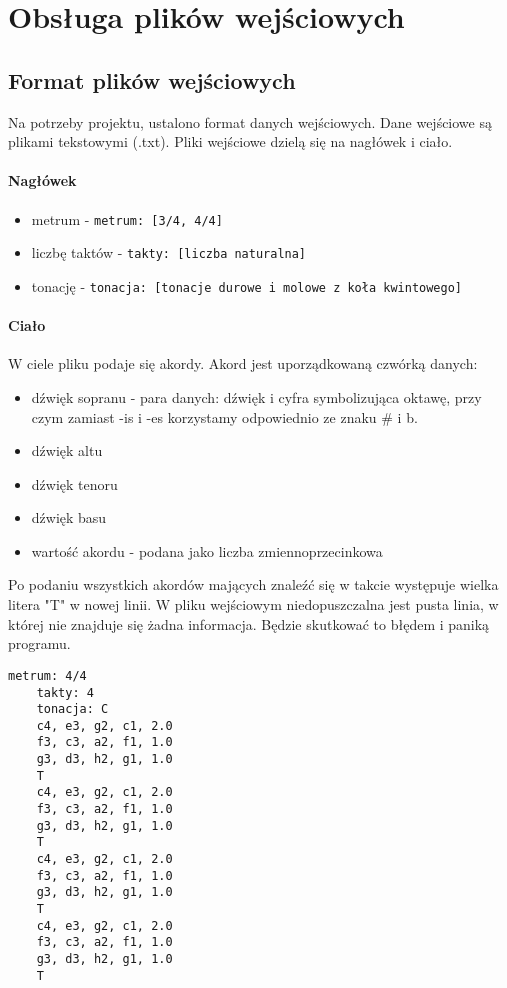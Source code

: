 \documentclass[dokumentacja.tex]{subfiles}
\begin{document}
\section{Obsługa plików wejściowych}
\subsection{Format plików wejściowych}
Na potrzeby projektu, ustalono format danych wejściowych. Dane wejściowe są plikami tekstowymi (.txt). Pliki wejściowe dzielą się na nagłówek i ciało. 
\paragraph*{Nagłówek}
\begin{itemize}
    \item metrum - \texttt{metrum: [3/4, 4/4]}
    \item liczbę taktów - \texttt{takty: [liczba naturalna]}
    \item tonację - \texttt{tonacja: [tonacje durowe i molowe z koła kwintowego]}
\end{itemize}
\paragraph*{Ciało}
W ciele pliku podaje się akordy. Akord jest uporządkowaną czwórką danych:
\begin{itemize}
    \item dźwięk sopranu - para danych: dźwięk i cyfra symbolizująca oktawę, przy czym zamiast -is i -es korzystamy odpowiednio ze znaku \# i b. 
    \item dźwięk altu
    \item dźwięk tenoru
    \item dźwięk basu
    \item wartość akordu - podana jako liczba zmiennoprzecinkowa
\end{itemize} 
Po podaniu wszystkich akordów mających znaleźć się w takcie występuje wielka litera "T" w nowej linii. 
W pliku wejściowym niedopuszczalna jest pusta linia, w której nie znajduje się żadna informacja. Będzie skutkować to błędem i paniką programu. 
\begin{lstlisting}[caption={Przykładowy poprawny plik wejściowy}, label=lst:wejscie-przyklad]
    metrum: 4/4
    takty: 4
    tonacja: C
    c4, e3, g2, c1, 2.0
    f3, c3, a2, f1, 1.0
    g3, d3, h2, g1, 1.0
    T
    c4, e3, g2, c1, 2.0
    f3, c3, a2, f1, 1.0
    g3, d3, h2, g1, 1.0
    T
    c4, e3, g2, c1, 2.0
    f3, c3, a2, f1, 1.0
    g3, d3, h2, g1, 1.0
    T
    c4, e3, g2, c1, 2.0
    f3, c3, a2, f1, 1.0
    g3, d3, h2, g1, 1.0
    T
    \end{lstlisting}
\end{document}
